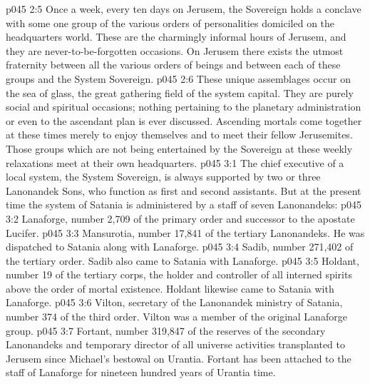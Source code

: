 \vs p045 2:5 Once a week, every ten days on Jerusem, the Sovereign holds a conclave with some one group of the various orders of personalities domiciled on the headquarters world. These are the charmingly informal hours of Jerusem, and they are never\hyp{}to\hyp{}be\hyp{}forgotten occasions. On Jerusem there exists the utmost fraternity between all the various orders of beings and between each of these groups and the System Sovereign.
\vs p045 2:6 These unique assemblages occur on the sea of glass, the great gathering field of the system capital. They are purely social and spiritual occasions; nothing pertaining to the planetary administration or even to the ascendant plan is ever discussed. Ascending mortals come together at these times merely to enjoy themselves and to meet their fellow Jerusemites. Those groups which are not being entertained by the Sovereign at these weekly relaxations meet at their own headquarters.
\vs p045 3:1 The chief executive of a local system, the System Sovereign, is always supported by two or three Lanonandek Sons, who function as first and second assistants. But at the present time the system of Satania is administered by a staff of seven Lanonandeks:
\vs p045 3:2 \bibnobreakspace {} Lanaforge, number 2,709 of the primary order and successor to the apostate Lucifer.
\vs p045 3:3 \pc {}\bibnobreakspace {} Mansurotia, number 17,841 of the tertiary Lanonandeks. He was dispatched to Satania along with Lanaforge.
\vs p045 3:4 \pc {}\bibnobreakspace {} Sadib, number 271,402 of the tertiary order. Sadib also came to Satania with Lanaforge.
\vs p045 3:5 \pc {}\bibnobreakspace {} Holdant, number 19 of the tertiary corps, the holder and controller of all interned spirits above the order of mortal existence. Holdant likewise came to Satania with Lanaforge.
\vs p045 3:6 \pc {}\bibnobreakspace {} Vilton, secretary of the Lanonandek ministry of Satania, number 374 of the third order. Vilton was a member of the original Lanaforge group.
\vs p045 3:7 \pc {}\bibnobreakspace {} Fortant, number 319,847 of the reserves of the secondary Lanonandeks and temporary director of all universe activities transplanted to Jerusem since Michael’s bestowal on Urantia. Fortant has been attached to the staff of Lanaforge for nineteen hundred years of Urantia time.
